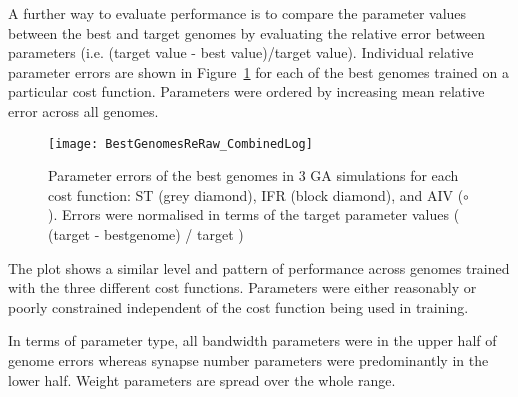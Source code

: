 A further way to evaluate {\GA} performance is to compare the parameter values
between the best and target genomes by evaluating the relative error
between parameters (i.e. (target value - best value)/target value). Individual 
relative parameter errors are shown in Figure~\ref{fig:GA:R2} for
each of the best genomes trained on a particular cost function. Parameters
were ordered by increasing mean relative error across all genomes.

\smallskip{}

\begin{figure}[th!]
  \centering
  \texttt{[image: BestGenomesReRaw\_CombinedLog]}
  \caption[Best genome parameter errors]{Parameter errors of the best genomes in 3 {GA}
    simulations for each cost function: ST (grey diamond),%
IFR (block diamond),%
and AIV (${\circ}$). Errors were normalised in terms
    of the target parameter values ( (target - bestgenome) / target )}\label{fig:GA:R2}
\end{figure}


The plot shows a similar level and pattern of performance across
genomes trained with the three different cost functions. Parameters were
either reasonably or poorly constrained independent of the cost function
being used in training.

\smallskip{}

In terms of parameter type, all bandwidth parameters were in the upper half
of genome errors whereas synapse number parameters were predominantly in
the lower half.  Weight parameters are spread over the whole range.


% 



